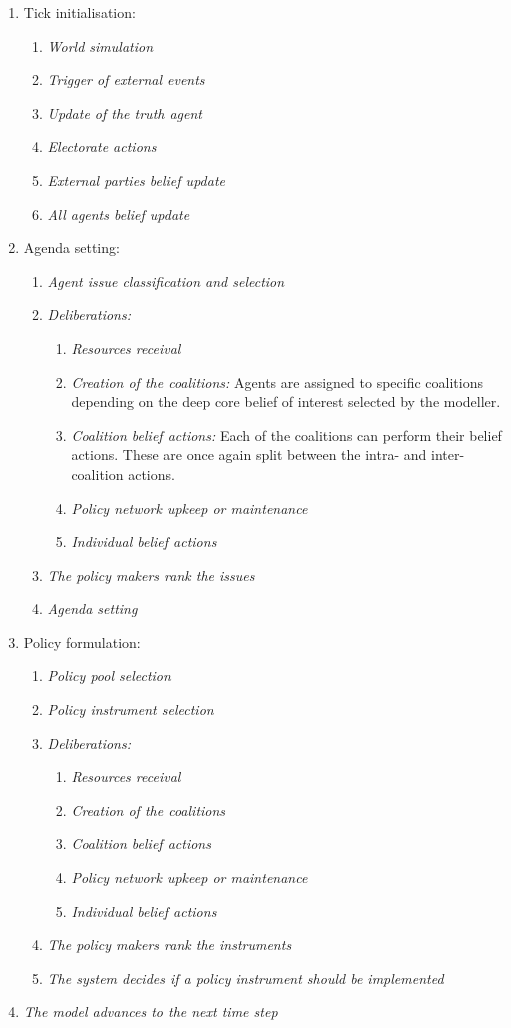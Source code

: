 \begin{enumerate}
\item Tick initialisation:
	\begin{enumerate}
	\item \emph{World simulation}
	\item \emph{Trigger of external events}
	\item \emph{Update of the truth agent}
	\item \emph{Electorate actions}
	\item \emph{External parties belief update}
	\item \emph{All agents belief update}
	\end{enumerate}
\item Agenda setting:
	\begin{enumerate}
	\item \emph{Agent issue classification and selection}
	\item \emph{Deliberations:}
		\begin{enumerate}
		\item \emph{Resources receival}
		\item \emph{Creation of the coalitions:} Agents are assigned to specific coalitions depending on the deep core belief of interest selected by the modeller.
		\item \emph{Coalition belief actions:} Each of the coalitions can perform their belief actions. These are once again split between the intra- and inter-coalition actions.
		\item \emph{Policy network upkeep or maintenance}
		\item \emph{Individual belief actions}
		\end{enumerate}
	\item \emph{The policy makers rank the issues}
	\item \emph{Agenda setting}
	\end{enumerate}
\item Policy formulation:
	\begin{enumerate}
	\item \emph{Policy pool selection}
	\item \emph{Policy instrument selection}
	\item \emph{Deliberations:}
		\begin{enumerate}
		\item \emph{Resources receival}
		\item \emph{Creation of the coalitions}
		\item \emph{Coalition belief actions}
		\item \emph{Policy network upkeep or maintenance}
		\item \emph{Individual belief actions}
		\end{enumerate}
	\item \emph{The policy makers rank the instruments}
	\item \emph{The system decides if a policy instrument should be implemented}
	\end{enumerate}
\item \emph{The model advances to the next time step}
\end{enumerate}


